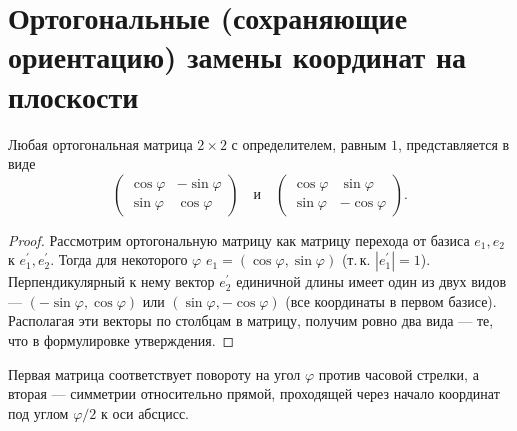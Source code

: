 \section{Ортогональные (сохраняющие ориентацию) замены координат на плоскости}

\begin{statement}
    Любая ортогональная матрица $2 \times 2$ с определителем, равным $1$, представляется в виде
    $$
    \begin{pmatrix}
        \cos\varphi & -\sin\varphi\\
        \sin\varphi & \cos\varphi
    \end{pmatrix}\quad\text{и}\quad
    \begin{pmatrix}
        \cos\varphi & \sin\varphi\\
        \sin\varphi & -\cos\varphi
    \end{pmatrix}.
    $$
\end{statement}

\begin{proof}
    Рассмотрим ортогональную матрицу как матрицу перехода от базиса $e_1, e_2$ к $e_1^\prime, e_2^\prime$. Тогда для некоторого $\varphi$ $e_1 = (\cos\varphi, \sin\varphi)$ (т.\,к. $|e_1^\prime| = 1$). Перпендикулярный к нему вектор $e_2^\prime$ единичной длины имеет один из двух видов --- $(-\sin\varphi, \cos\varphi)$ или $(\sin\varphi, -\cos\varphi)$ (все координаты в первом базисе). Располагая эти векторы по столбцам в матрицу, получим ровно два вида --- те, что в формулировке утверждения.
\end{proof}

\begin{remark}
    Первая матрица соответствует повороту на угол $\varphi$ против часовой стрелки, а вторая --- симметрии относительно прямой, проходящей через начало координат под углом $\varphi / 2$ к оси абсцисс.
\end{remark}

